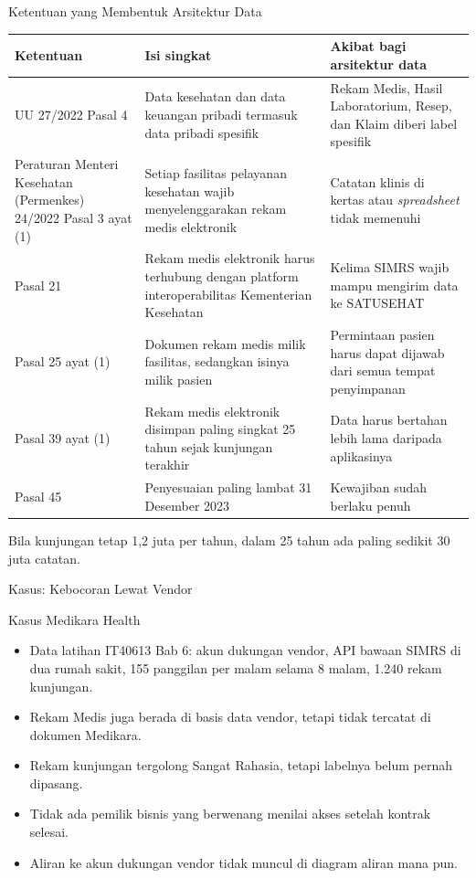 \documentclass[aspectratio=169, table, 12pt]{beamer}
\begin{document}
\begin{frame}{{\Large Ketentuan yang Membentuk Arsitektur Data}}
  \scriptsize
  \begin{tabularx}{\textwidth}{>{\raggedright\arraybackslash}p{2.7cm}XX}
    \hline
    \textbf{Ketentuan} & \textbf{Isi singkat} & \textbf{Akibat bagi arsitektur data} \\
    \hline
    UU 27/2022 Pasal 4 & Data kesehatan dan data keuangan pribadi termasuk data
      pribadi spesifik & Rekam Medis, Hasil Laboratorium, Resep, dan Klaim diberi
      label spesifik \\
    \hline
    Peraturan Menteri Kesehatan (Permenkes) 24/2022 Pasal 3 ayat (1) & Setiap fasilitas pelayanan kesehatan
      wajib menyelenggarakan rekam medis elektronik & Catatan klinis di kertas
      atau \textit{spreadsheet} tidak memenuhi \\
    \hline
    Pasal 21 & Rekam medis elektronik harus terhubung dengan platform
      interoperabilitas Kementerian Kesehatan & Kelima SIMRS wajib mampu
      mengirim data ke SATUSEHAT \\
    \hline
    Pasal 25 ayat (1) & Dokumen rekam medis milik fasilitas, sedangkan isinya
      milik pasien & Permintaan pasien harus dapat dijawab dari semua tempat
      penyimpanan \\
    \hline
    Pasal 39 ayat (1) & Rekam medis elektronik disimpan paling singkat 25 tahun
      sejak kunjungan terakhir & Data harus bertahan lebih lama daripada
      aplikasinya \\
    \hline
    Pasal 45 & Penyesuaian paling lambat 31 Desember 2023 & Kewajiban sudah
      berlaku penuh \\
    \hline
  \end{tabularx}

  \vspace{6pt}
  \small Bila kunjungan tetap 1,2 juta per tahun, dalam 25 tahun ada paling sedikit 30 juta catatan.
\end{frame}

\begin{frame}{{\Large Kasus: Kebocoran Lewat Vendor}}
  \begin{block}{Kasus Medikara Health}
    \small
    \begin{itemize}
      \item Data latihan IT40613 Bab 6: akun dukungan vendor, API bawaan SIMRS di dua rumah sakit,
            155 panggilan per malam selama 8 malam, 1.240 rekam kunjungan.
      \item Rekam Medis juga berada di basis data vendor, tetapi tidak tercatat di dokumen Medikara.
      \item Rekam kunjungan tergolong Sangat Rahasia, tetapi labelnya belum pernah dipasang.
      \item Tidak ada pemilik bisnis yang berwenang menilai akses setelah kontrak selesai.
      \item Aliran ke akun dukungan vendor tidak muncul di diagram aliran mana pun.
    \end{itemize}
  \end{block}
\end{frame}
\end{document}
